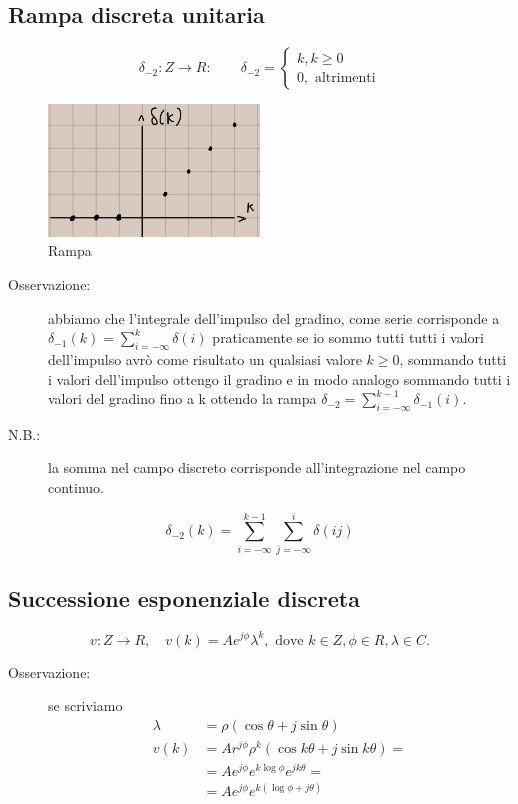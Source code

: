 \documentclass[a4paper, 12pt]{book}
\theoremstyle{plain}
\begin{document}
\subsection{Rampa discreta unitaria}

\[
    \delta_{-2}: Z \rightarrow R:\qquad \delta_{-2} = \begin{cases}
        k, k \ge 0\\
        0, \textrm{ altrimenti}
    \end{cases}
\]

\begin{figure}
    \includegraphics[width=0.5\textwidth]{rampa2.jpg}
    \caption{Rampa}
\end{figure}

\begin{description}
    \item[Osservazione: ] abbiamo che l'integrale dell'impulso del gradino, come serie corrisponde a $\delta_{-1}(k) = \sum_{i = -\infty}^k \delta(i)$ praticamente se io sommo tutti 
    tutti i valori dell'impulso avrò come risultato un qualsiasi valore $k \ge 0$, sommando tutti i valori dell'impulso ottengo il gradino e in modo analogo sommando tutti i valori 
    del gradino fino a k ottendo la rampa $\delta_{-2} = \sum_{i = -\infty}^{k - 1} \delta_{-1} (i)$.
    \item[N.B.: ] la somma nel campo discreto corrisponde all'integrazione nel campo continuo. 
\end{description}

\[
    \delta_{-2} (k) = \sum_{i = -\infty}^{k - 1} \sum_{j = -\infty}^i \delta(ij)
\]

\subsection{Successione esponenziale discreta}

\[
    v : Z \rightarrow R,\quad v(k) = A e^{j\phi} \lambda^k, \textrm{ dove } k \in Z, \phi \in R,\lambda \in C.   
\]
\begin{description}
    \item[Osservazione: ] se scriviamo 
    \[\begin{split}
        \lambda &= \rho(\cos \theta + j\sin \theta)\\
        v(k) &= A r^{j\phi}\rho^k(\cos k \theta + j \sin k \theta) =\\
        &= A e^{j \phi} e^{k \log \phi} e^{jk\theta} = \\
        &= A e^{j\phi} e^{k(\log \phi + j \theta)}
      \end{split}
    \]
\end{description}
\end{document}
